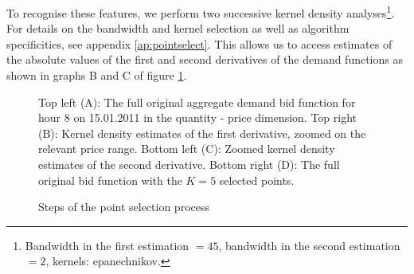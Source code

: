 To recognise these features, we perform two successive kernel density analyses\footnote{Bandwidth in the first estimation $=45$, bandwidth in the second estimation $=2$, kernels: epanechnikov.}. 
For details on the bandwidth and kernel selection as well as algorithm specificities, see appendix \ref{ap:pointselect}. This allows us to access estimates of the absolute values of the first and second derivatives of the demand functions as shown in graphs B and C of figure \ref{selectedpoints}. 
\begin{figure}[!ht]
\begin{center}
\caption{Steps of the point selection process}
\label{selectedpoints}
\end{center}
{\small Top left (A): The full original aggregate demand bid function for hour 8 on 15.01.2011 in the quantity - price dimension. Top right (B): Kernel density estimates of the first derivative, zoomed on the relevant price range. Bottom left (C): Zoomed kernel density estimates of the second derivative. Bottom right (D): The full original bid function with the $K=5$ selected points. 
}
\end{figure}


